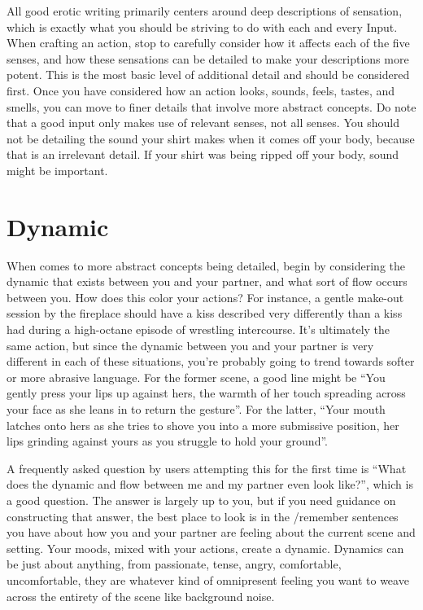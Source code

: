 \documentclass[Source-main.tex]{subfiles}
\begin{document}
All good erotic writing primarily centers around deep descriptions of sensation, which is exactly what you should be striving to do with each and every Input.
When crafting an action, stop to carefully consider how it affects each of the five senses, and how these sensations can be detailed to make your descriptions more potent.
This is the most basic level of additional detail and should be considered first.
Once you have considered how an action looks, sounds, feels, tastes, and smells, you can move to finer details that involve more abstract concepts.
Do note that a good input only makes use of relevant senses, not all senses.
You should not be detailing the sound your shirt makes when it comes off your body, because that is an irrelevant detail.
If your shirt was being ripped off your body, sound might be important.

\section{Dynamic}

When comes to more abstract concepts being detailed, begin by considering the dynamic that exists between you and your partner, and what sort of flow occurs between you.
How does this color your actions? For instance, a gentle make-out session by the fireplace should have a kiss described very differently than a kiss had during a high-octane episode of wrestling intercourse.
It’s ultimately the same action, but since the dynamic between you and your partner is very different in each of these situations, you’re probably going to trend towards softer or more abrasive language.
For the former scene, a good line might be “You gently press your lips up against hers, the warmth of her touch spreading across your face as she leans in to return the gesture”.
For the latter, “Your mouth latches onto hers as she tries to shove you into a more submissive position, her lips grinding against yours as you struggle to hold your ground”.

A frequently asked question by users attempting this for the first time is “What does the dynamic and flow between me and my partner even look like?”, which is a good question.
The answer is largely up to you, but if you need guidance on constructing that answer, the best place to look is in the /remember sentences you have about how you and your partner are feeling about the current scene and setting.
Your moods, mixed with your actions, create a dynamic.
Dynamics can be just about anything, from passionate, tense, angry, comfortable, uncomfortable, they are whatever kind of omnipresent feeling you want to weave across the entirety of the scene like background noise.
\end{document}
